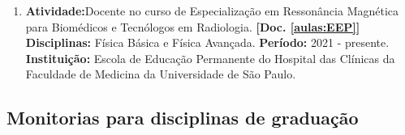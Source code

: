 \documentclass[a4paper,oneside,10pt]{article}
\begin{document}
\begin{enumerate}
        \renewcommand{\labelenumi}{{\large\bfseries\arabic{enumi}.}}

        \item \textbf{Atividade:}Docente no curso de Especialização em Ressonância Magnética para Biomédicos e Tecnólogos em Radiologia. \textbf{[Doc. \ref{aulas:EEP}]}\\
              \textbf{Disciplinas:} Física Básica e Física Avançada.
              \textbf{Período:} 2021 - presente.
              \textbf{Instituição:} Escola de Educação Permanente do Hospital das Clínicas da Faculdade de Medicina da Universidade de São Paulo.

\end{enumerate}

\subsection{Monitorias para disciplinas de graduação}
\vspace{0.3cm}
\end{document}
